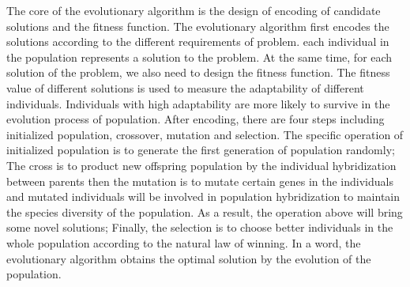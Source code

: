 The core of the evolutionary algorithm is the design of encoding of candidate
solutions and the fitness function. The evolutionary algorithm first encodes the
solutions according to the different requirements of problem. each individual in
the population represents a solution to the problem. At the same time, for each
solution of the problem, we also need to design the fitness function. The
fitness value of different solutions is used to measure the adaptability of
different individuals. Individuals with high adaptability are more likely to
survive in the evolution process of population. After encoding, there are four
steps including initialized population, crossover, mutation and selection. The
specific operation of initialized population is to generate the first generation
of population randomly; The cross is to product new offspring population by the
individual hybridization between parents then the mutation is to mutate certain
genes in the individuals and mutated individuals will be involved in population
hybridization to maintain the species diversity of the population. As a result,
the operation above will bring some novel solutions; Finally, the selection is
to choose better individuals in the whole population according to the natural
law of winning.  In a word, the evolutionary algorithm obtains the optimal
solution by the evolution of the population.



